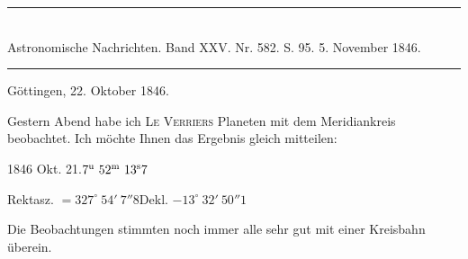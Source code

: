 \clearpage
\hypertarget{native-476-letter}{}
\begin{center}
\rule{0.55\linewidth}{0.4pt}\\[2pt]
Astronomische Nachrichten. Band XXV. Nr. 582. S. 95. 5. November 1846.\\[2pt]
\rule{0.55\linewidth}{0.4pt}
\end{center}
\begin{flushright}Göttingen, 22. Oktober 1846.\end{flushright}

Gestern Abend habe ich \textsc{Le Verriers} Planeten mit dem Meridiankreis beobachtet. Ich möchte Ihnen das Ergebnis gleich mitteilen:

\begin{center}
1846 Okt. 21.\quad $7^{\rm u}\ 52^{\rm m}\ 13^{\rm s}7$\par
Rektasz. $=327^\circ\ 54'\ 7''8$\qquad Dekl. $-13^\circ\ 32'\ 50''1$
\end{center}

Die Beobachtungen stimmten noch immer alle sehr gut mit einer Kreisbahn überein.
